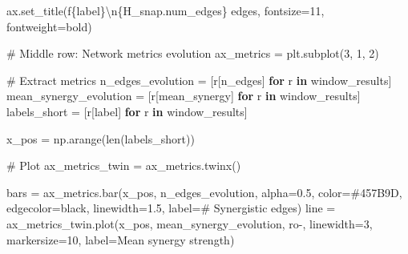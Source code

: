 \documentclass[
  11pt,
  letterpaper,
  oneside,
  openany]{book}
\newenvironment{Shaded}{\begin{snugshade}}{\end{snugshade}}
\newcommand{\BuiltInTok}[1]{\textcolor[rgb]{0.00,0.23,0.31}{#1}}
\newcommand{\CharTok}[1]{\textcolor[rgb]{0.13,0.47,0.30}{#1}}
\newcommand{\CommentTok}[1]{\textcolor[rgb]{0.37,0.37,0.37}{#1}}
\newcommand{\ControlFlowTok}[1]{\textcolor[rgb]{0.00,0.23,0.31}{\textbf{#1}}}
\newcommand{\DecValTok}[1]{\textcolor[rgb]{0.68,0.00,0.00}{#1}}
\newcommand{\FloatTok}[1]{\textcolor[rgb]{0.68,0.00,0.00}{#1}}
\newcommand{\KeywordTok}[1]{\textcolor[rgb]{0.00,0.23,0.31}{\textbf{#1}}}
\newcommand{\NormalTok}[1]{\textcolor[rgb]{0.00,0.23,0.31}{#1}}
\newcommand{\OperatorTok}[1]{\textcolor[rgb]{0.37,0.37,0.37}{#1}}
\newcommand{\SpecialCharTok}[1]{\textcolor[rgb]{0.37,0.37,0.37}{#1}}
\newcommand{\SpecialStringTok}[1]{\textcolor[rgb]{0.13,0.47,0.30}{#1}}
\newcommand{\StringTok}[1]{\textcolor[rgb]{0.13,0.47,0.30}{#1}}
\begin{document}
\begin{Shaded}
\begin{Highlighting}[]
\NormalTok{    ax.set\_title(}\SpecialStringTok{f\textquotesingle{}}\SpecialCharTok{\{}\NormalTok{label}\SpecialCharTok{\}}\CharTok{\textbackslash{}n}\SpecialCharTok{\{}\NormalTok{H\_snap}\SpecialCharTok{.}\NormalTok{num\_edges}\SpecialCharTok{\}}\SpecialStringTok{ edges\textquotesingle{}}\NormalTok{, }
\NormalTok{                fontsize}\OperatorTok{=}\DecValTok{11}\NormalTok{, fontweight}\OperatorTok{=}\StringTok{\textquotesingle{}bold\textquotesingle{}}\NormalTok{)}

\CommentTok{\# Middle row: Network metrics evolution}
\NormalTok{ax\_metrics }\OperatorTok{=}\NormalTok{ plt.subplot(}\DecValTok{3}\NormalTok{, }\DecValTok{1}\NormalTok{, }\DecValTok{2}\NormalTok{)}

\CommentTok{\# Extract metrics}
\NormalTok{n\_edges\_evolution }\OperatorTok{=}\NormalTok{ [r[}\StringTok{\textquotesingle{}n\_edges\textquotesingle{}}\NormalTok{] }\ControlFlowTok{for}\NormalTok{ r }\KeywordTok{in}\NormalTok{ window\_results]}
\NormalTok{mean\_synergy\_evolution }\OperatorTok{=}\NormalTok{ [r[}\StringTok{\textquotesingle{}mean\_synergy\textquotesingle{}}\NormalTok{] }\ControlFlowTok{for}\NormalTok{ r }\KeywordTok{in}\NormalTok{ window\_results]}
\NormalTok{labels\_short }\OperatorTok{=}\NormalTok{ [r[}\StringTok{\textquotesingle{}label\textquotesingle{}}\NormalTok{] }\ControlFlowTok{for}\NormalTok{ r }\KeywordTok{in}\NormalTok{ window\_results]}

\NormalTok{x\_pos }\OperatorTok{=}\NormalTok{ np.arange(}\BuiltInTok{len}\NormalTok{(labels\_short))}

\CommentTok{\# Plot}
\NormalTok{ax\_metrics\_twin }\OperatorTok{=}\NormalTok{ ax\_metrics.twinx()}

\NormalTok{bars }\OperatorTok{=}\NormalTok{ ax\_metrics.bar(x\_pos, n\_edges\_evolution, alpha}\OperatorTok{=}\FloatTok{0.5}\NormalTok{, color}\OperatorTok{=}\StringTok{\textquotesingle{}\#457B9D\textquotesingle{}}\NormalTok{,}
\NormalTok{                     edgecolor}\OperatorTok{=}\StringTok{\textquotesingle{}black\textquotesingle{}}\NormalTok{, linewidth}\OperatorTok{=}\FloatTok{1.5}\NormalTok{, label}\OperatorTok{=}\StringTok{\textquotesingle{}\# Synergistic edges\textquotesingle{}}\NormalTok{)}
\NormalTok{line }\OperatorTok{=}\NormalTok{ ax\_metrics\_twin.plot(x\_pos, mean\_synergy\_evolution, }\StringTok{\textquotesingle{}ro{-}\textquotesingle{}}\NormalTok{, linewidth}\OperatorTok{=}\DecValTok{3}\NormalTok{,}
\NormalTok{                           markersize}\OperatorTok{=}\DecValTok{10}\NormalTok{, label}\OperatorTok{=}\StringTok{\textquotesingle{}Mean synergy strength\textquotesingle{}}\NormalTok{)}


\end{Highlighting}
\end{Shaded}
\end{document}
